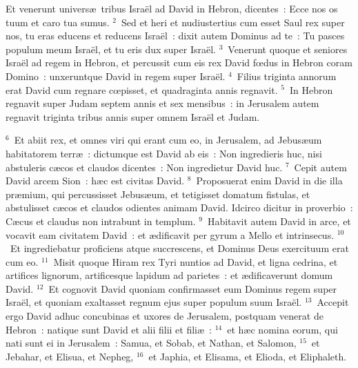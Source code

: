 \lettrine[lines=3,image=true,loversize=0.05,lraise=-0.03]{E}{}t venerunt univers\ae\ tribus Isra\"el ad David in Hebron, dicentes~: Ecce nos os tuum et caro tua sumus.
${}^{2}$~Sed et heri et nudiustertius cum esset Saul rex super nos, tu eras educens et reducens Isra\"el~: dixit autem Dominus ad te~: Tu pasces populum meum Isra\"el, et tu eris dux super Isra\"el.
${}^{3}$~Venerunt quoque et seniores Isra\"el ad regem in Hebron, et percussit cum eis rex David fœdus in Hebron coram Domino~: unxeruntque David in regem super Isra\"el.
${}^{4}$~Filius triginta annorum erat David cum regnare cœpisset, et quadraginta annis regnavit.
${}^{5}$~In Hebron regnavit super Judam septem annis et sex mensibus~: in Jerusalem autem regnavit triginta tribus annis super omnem Isra\"el et Judam.


${}^{6}$~Et abiit rex, et omnes viri qui erant cum eo, in Jerusalem, ad Jebus\ae um habitatorem terr\ae~: dictumque est David ab eis~: Non ingredieris huc, nisi abstuleris c\ae cos et claudos dicentes~: Non ingredietur David huc.
${}^{7}$~Cepit autem David arcem Sion~: h\ae c est civitas David.
${}^{8}$~Proposuerat enim David in die illa pr\ae mium, qui percussisset Jebus\ae um, et tetigisset domatum fistulas, et abstulisset c\ae cos et claudos odientes animam David. Idcirco dicitur in proverbio~: C\ae cus et claudus non intrabunt in templum.
${}^{9}$~Habitavit autem David in arce, et vocavit eam civitatem David~: et \ae dificavit per gyrum a Mello et intrinsecus.
${}^{10}$~Et ingrediebatur proficiens atque succrescens, et Dominus Deus exercituum erat cum eo.
${}^{11}$~Misit quoque Hiram rex Tyri nuntios ad David, et ligna cedrina, et artifices lignorum, artificesque lapidum ad parietes~: et \ae dificaverunt domum David.
${}^{12}$~Et cognovit David quoniam confirmasset eum Dominus regem super Isra\"el, et quoniam exaltasset regnum ejus super populum suum Isra\"el.
${}^{13}$~Accepit ergo David adhuc concubinas et uxores de Jerusalem, postquam venerat de Hebron~: natique sunt David et alii filii et fili\ae~:
${}^{14}$~et h\ae c nomina eorum, qui nati sunt ei in Jerusalem~: Samua, et Sobab, et Nathan, et Salomon,
${}^{15}$~et Jebahar, et Elisua, et Nepheg,
${}^{16}$~et Japhia, et Elisama, et Elioda, et Eliphaleth.


